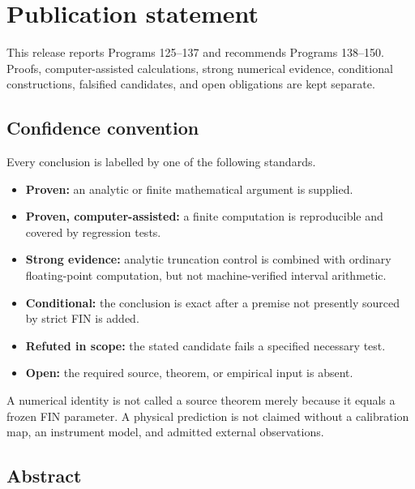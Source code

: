 \documentclass[11pt,a4paper,openany]{report}
\begin{document}
\chapter*{Publication statement}
This release reports Programs 125--137 and recommends Programs 138--150.
Proofs, computer-assisted calculations, strong numerical evidence,
conditional constructions, falsified candidates, and open obligations are
kept separate.

\tableofcontents
\clearpage
{}

\section{Confidence convention}

Every conclusion is labelled by one of the following standards.

\begin{itemize}
\item 
\textbf{Proven:} an analytic or finite mathematical argument is supplied.

\item 
\textbf{Proven, computer-assisted:} a finite computation is reproducible and covered by regression tests.

\item 
\textbf{Strong evidence:} analytic truncation control is combined with ordinary floating-point computation, but not machine-verified interval arithmetic.

\item 
\textbf{Conditional:} the conclusion is exact after a premise not presently sourced by strict FIN is added.

\item 
\textbf{Refuted in scope:} the stated candidate fails a specified necessary test.

\item 
\textbf{Open:} the required source, theorem, or empirical input is absent.

\end{itemize}

A numerical identity is not called a source theorem merely because it equals a frozen FIN parameter. A physical prediction is not claimed without a calibration map, an instrument model, and admitted external observations.

\section{Abstract}
\end{document}
